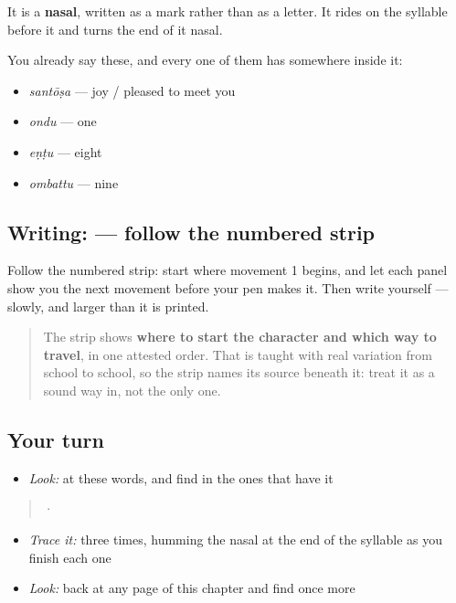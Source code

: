 It is a \textbf{nasal}, written as a mark rather than as a letter. It rides on the syllable before it and turns the end of it nasal.

You already say these, and every one of them has  somewhere inside it:

\begin{itemize}
\raggedright
  \item \textbf{} \emph{santōṣa} — joy / pleased to meet you
  \item \textbf{} \emph{ondu} — one
  \item \textbf{} \emph{eṇṭu} — eight
  \item \textbf{} \emph{ombattu} — nine
\end{itemize}

\subsection*{Writing:  — follow the numbered strip}

Follow the numbered strip: start where movement 1 begins, and let each panel show you the next movement before your pen makes it. Then write  yourself — slowly, and larger than it is printed.

\begin{quote}
The strip shows \textbf{where to start the character and which way to travel}, in one attested order. That is taught with real variation from school to school, so the strip names its source beneath it: treat it as a sound way in, not the only one.
\end{quote}

\subsection*{Your turn}
\begin{itemize}
\raggedright
  \item \emph{Look:} at these words, and find  in the ones that have it
\end{itemize}

\begin{quote}
  ·  
\end{quote}

\begin{itemize}
\raggedright
  \item \emph{Trace it:}  three times, humming the nasal at the end of the syllable as you finish each one
  \item \emph{Look:} back at any page of this chapter and find  once more
\end{itemize}

